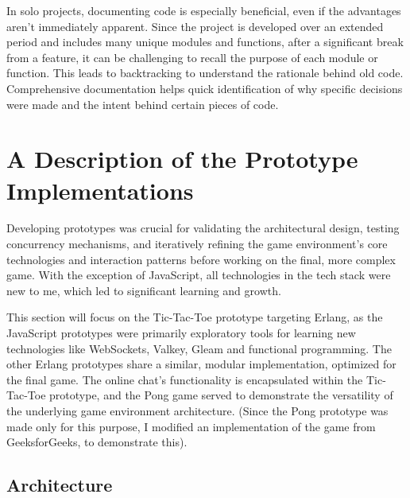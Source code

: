 \documentclass[]{final}
\begin{document}
In solo projects, documenting code is especially beneficial, even if the advantages
aren't immediately apparent. Since the project is developed over an extended period
and includes many unique modules and functions, after a significant break from a
feature, it can be challenging to recall the purpose of each module or function.
This leads to backtracking to understand the rationale behind old code.
Comprehensive documentation helps quick identification of why specific decisions
were made and the intent behind certain pieces of code.

\chapter{A Description of the Prototype Implementations}

Developing prototypes was crucial for validating the architectural design,
testing concurrency mechanisms, and iteratively refining the game environment's
core technologies and interaction patterns before working on the final,
more complex game. With the exception of JavaScript,
all technologies in the tech stack were new to me, which led to
significant learning and growth.

This section will focus on the Tic-Tac-Toe prototype targeting Erlang,
as the JavaScript prototypes were primarily exploratory tools for learning
new technologies like WebSockets, Valkey, Gleam and functional programming.
The other Erlang prototypes share a similar, modular implementation,
optimized for the final game. The online chat's functionality is
encapsulated within the Tic-Tac-Toe prototype, and the Pong game
served to demonstrate the versatility of the underlying game
environment architecture. (Since the Pong prototype was made only for this purpose,
I modified an implementation of the game from GeeksforGeeks, to demonstrate this).\cite{GeeksforGeeks_pong_2021}

\section{Architecture}
\end{document}
